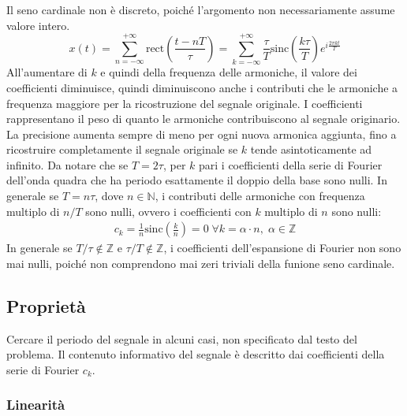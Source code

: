 \documentclass{article}
\numberwithin{equation}{subsection}
\begin{document}
Il seno cardinale non è discreto, poiché l'argomento non necessariamente assume valore intero. 
\begin{equation*}
    x(t)=\displaystyle\sum_{n=-\infty}^{+\infty}\mbox{rect}\left(\frac{t-nT}{\tau}\right)=\sum_{k=-\infty}^{+\infty}\frac{\tau}{T}\mbox{sinc}\left(\frac{k \tau}{T}\right)e^{i\frac{2\pi kt}{T}}
\end{equation*}
All'aumentare di $k$ e quindi della frequenza delle armoniche, il valore dei coefficienti diminuisce, quindi diminuiscono anche i contributi che le armoniche a frequenza 
maggiore per la ricostruzione del segnale originale. I coefficienti rappresentano il peso di quanto le armoniche contribuiscono al segnale originario. La precisione 
aumenta sempre di meno per ogni nuova armonica aggiunta, fino a ricostruire completamente il segnale originale se $k$ tende asintoticamente ad infinito. Da notare che se 
$T=2\tau$, per $k$ pari i coefficienti della serie di Fourier dell'onda quadra che ha periodo esattamente il doppio della base sono nulli. In generale se $T=n\tau$, dove 
$n\in\mathbb{N}$, i contributi delle armoniche con frequenza multiplo di $n/T$ sono nulli, ovvero i coefficienti con $k$ multiplo di $n$ sono nulli:
\begin{gather*}
    c_k=\frac{1}{n}\mbox{sinc}\left(\frac{k}{n}\right)=0\;\forall k=\alpha\cdot n,\;\alpha\in\mathbb{Z}
\end{gather*}
In generale se $T/\tau\notin\mathbb{Z}$ e $\tau/T\notin\mathbb{Z}$, i coefficienti dell'espansione di Fourier non sono mai nulli, poiché non comprendono mai zeri triviali 
della funione seno cardinale. 

\subsection{Proprietà}

Cercare il periodo del segnale in alcuni casi, non specificato dal testo del problema. Il contenuto informativo del segnale è descritto dai coefficienti della serie di Fourier 
$c_k$. 

\subsubsection{Linearità}
\end{document}
